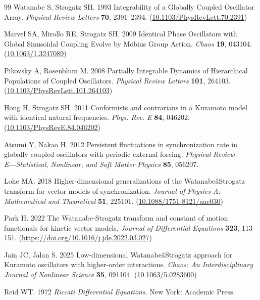 \documentclass[
amsmath,amssymb,
]{revtex4-2}
\begin{document}
\begin{thebibliography}{99}
Watanabe S, Strogatz SH. 1993  Integrability of a Globally Coupled Oscillator Array. {\em Physical Review Letters} \textbf{70}, 2391--2394.
(\href{http://dx.doi.org/10.1103/PhysRevLett.70.2391}{10.1103/PhysRevLett.70.2391})

Marvel SA, Mirollo RE, Strogatz SH. 2009  Identical Phase Oscillators with Global Sinusoidal Coupling Evolve by M{\"o}bius Group Action. {\em Chaos} \textbf{19}, 043104.
(\href{http://dx.doi.org/10.1063/1.3247089}{10.1063/1.3247089})

Pikovsky A, Rosenblum M. 2008  Partially Integrable Dynamics of Hierarchical Populations of Coupled Oscillators. {\em Physical Review Letters} \textbf{101}, 264103.
(\href{http://dx.doi.org/10.1103/PhysRevLett.101.264103}{10.1103/PhysRevLett.101.264103})

Hong H, Strogatz SH. 2011  Conformists and contrarians in a Kuramoto model with identical natural frequencies. {\em Phys. Rev. E} \textbf{84}, 046202.
(\href{http://dx.doi.org/10.1103/PhysRevE.84.046202}{10.1103/PhysRevE.84.046202})

Atsumi Y, Nakao H. 2012  Persistent fluctuations in synchronization rate in globally coupled oscillators with periodic external forcing. {\em Physical Review E―Statistical, Nonlinear, and Soft Matter Physics} \textbf{85}, 056207.

Lohe MA. 2018  Higher-dimensional generalizations of the Watanabe^^e2^^80^^93Strogatz transform for vector models of synchronization. {\em Journal of Physics A: Mathematical and Theoretical} \textbf{51}, 225101.
(\href{http://dx.doi.org/10.1088/1751-8121/aac030}{10.1088/1751-8121/aac030})

Park H. 2022  The Watanabe-Strogatz transform and constant of motion functionals for kinetic vector models. {\em Journal of Differential Equations} \textbf{323}, 113--151.
(\href{http://dx.doi.org/https://doi.org/10.1016/j.jde.2022.03.027}{https://doi.org/10.1016/j.jde.2022.03.027})

Jain JC, Jalan S. 2025  Low-dimensional Watanabe^^e2^^80^^93Strogatz approach for Kuramoto oscillators with higher-order interactions. {\em Chaos: An Interdisciplinary Journal of Nonlinear Science} \textbf{35}, 091104.
(\href{http://dx.doi.org/10.1063/5.0283600}{10.1063/5.0283600})

Reid WT. 1972 {\em Riccati Differential Equations}.
New York: Academic Press.


\end{thebibliography}
\end{document}
